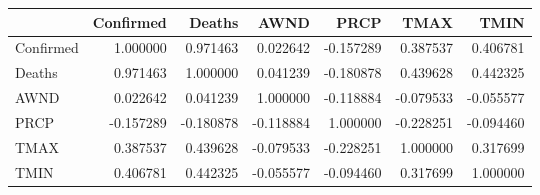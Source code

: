 \begin{tabular}{lrrrrrr}
\toprule
{} &  Confirmed &    Deaths &      AWND &      PRCP &      TMAX &      TMIN \\
\midrule
Confirmed &   1.000000 &  0.971463 &  0.022642 & -0.157289 &  0.387537 &  0.406781 \\
Deaths    &   0.971463 &  1.000000 &  0.041239 & -0.180878 &  0.439628 &  0.442325 \\
AWND      &   0.022642 &  0.041239 &  1.000000 & -0.118884 & -0.079533 & -0.055577 \\
PRCP      &  -0.157289 & -0.180878 & -0.118884 &  1.000000 & -0.228251 & -0.094460 \\
TMAX      &   0.387537 &  0.439628 & -0.079533 & -0.228251 &  1.000000 &  0.317699 \\
TMIN      &   0.406781 &  0.442325 & -0.055577 & -0.094460 &  0.317699 &  1.000000 \\
\bottomrule
\end{tabular}

